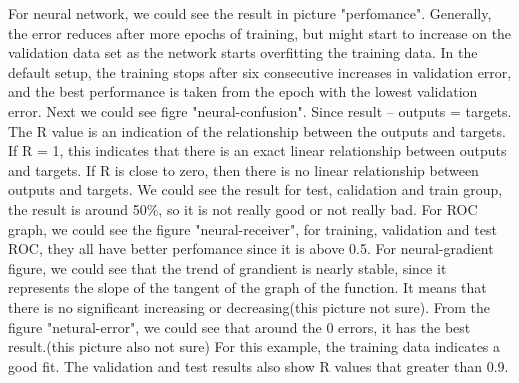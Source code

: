 \documentclass[]{article}
\begin{document}
For neural network, we could see the result in picture "perfomance".  Generally, the error reduces after more epochs of training, but might start to increase on the validation data set as the network starts overfitting the training data. In the default setup, the training stops after six consecutive increases in validation error, and the best performance is taken from the epoch with the lowest validation error. Next we could see figre "neural-confusion". Since result – outputs = targets. The R value is an indication of the relationship between the outputs and targets. If R = 1, this indicates that there is an exact linear relationship between outputs and targets. If R is close to zero, then there is no linear relationship between outputs and targets. We could see the result for test, calidation and train group, the result is around 50\%, so it is not really good or not really bad. For ROC graph, we could see the figure "neural-receiver", for training, validation and test ROC, they all have better perfomance since it is above 0.5. For neural-gradient
figure, we could see that the trend of grandient is nearly stable, since it represents the slope of the tangent of the graph of the function. It means that there is no significant increasing or decreasing(this picture not sure). From the figure "netural-error", we could see that around the 0 errors, it has the best result.(this picture also not sure)
For this example, the training data indicates a good fit. The validation and test results also show R values that greater than 0.9.
\end{document}
